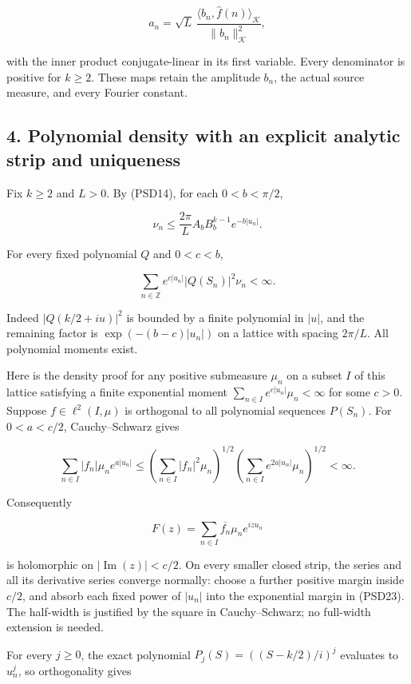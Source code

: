 \[
a_n=\sqrt L\,
\frac{\langle b_n,\widehat f(n)\rangle_{\mathcal K}}{\|b_n\|_{\mathcal K}^2},
\tag{PSD20}
\]

with the inner product conjugate-linear in its first variable. Every denominator is positive for \(k\ge 2\). These maps retain the amplitude \(b_n\), the actual source measure, and every Fourier constant.

\subsection{4. Polynomial density with an explicit analytic strip and uniqueness}\label{polynomial-density-with-an-explicit-analytic-strip-and-uniqueness}

Fix \(k\ge 2\) and \(L>0\). By (PSD14), for each \(0<b<\pi/2\),

\[
\nu_n\le\frac{2\pi}{L}A_bB_b^{k-1}e^{-b|u_n|}.
\tag{PSD21}
\]

For every fixed polynomial \(Q\) and \(0<c<b\),

\[
\sum_{n\in\mathbb Z}e^{c|u_n|}|Q(S_n)|^2\nu_n<\infty.
\tag{PSD22}
\]

Indeed \(|Q(k/2+iu)|^2\) is bounded by a finite polynomial in \(|u|\), and the remaining factor is \(\exp(-(b-c)|u_n|)\) on a lattice with spacing \(2\pi/L\). All polynomial moments exist.

Here is the density proof for any positive submeasure \(\mu_n\) on a subset \(I\) of this lattice satisfying a finite exponential moment \(\sum_{n\in I}e^{c|u_n|}\mu_n<\infty\) for some \(c>0\). Suppose \(f\in\ell^2(I,\mu)\) is orthogonal to all polynomial sequences \(P(S_n)\). For \(0<a<c/2\), Cauchy--Schwarz gives

\[
\sum_{n\in I}|f_n|\mu_ne^{a|u_n|}
\le\left(\sum_{n\in I}|f_n|^2\mu_n\right)^{1/2}
\left(\sum_{n\in I}e^{2a|u_n|}\mu_n\right)^{1/2}<\infty.
\tag{PSD23}
\]

Consequently

\[
F(z)=\sum_{n\in I}\overline{f_n}\mu_ne^{izu_n}
\tag{PSD24}
\]

is holomorphic on \(|\operatorname{Im}(z)|<c/2\). On every smaller closed strip, the series and all its derivative series converge normally: choose a further positive margin inside \(c/2\), and absorb each fixed power of \(|u_n|\) into the exponential margin in (PSD23). The half-width is justified by the square in Cauchy--Schwarz; no full-width extension is needed.

For every \(j\ge 0\), the exact polynomial \(P_j(S)=((S-k/2)/i)^j\) evaluates to \(u_n^j\), so orthogonality gives

